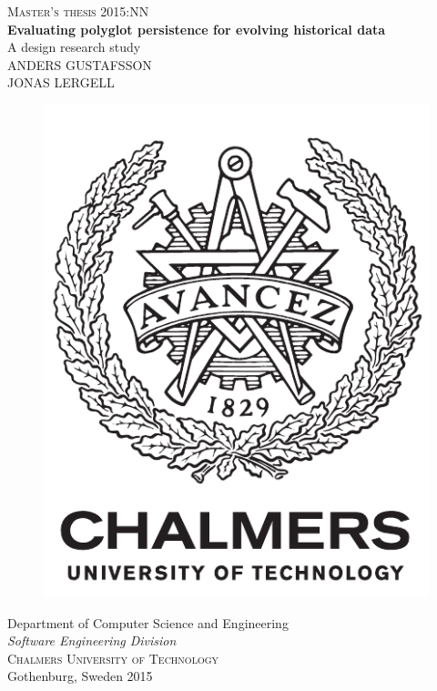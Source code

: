 \newpage
\thispagestyle{empty}
\begin{center}
	\textsc{\large Master's thesis 2015:NN}\\[4cm]
	\textbf{\Large Evaluating polyglot persistence for evolving historical data} \\[1cm]
	{\large A design research study}\\[1cm]
	{\large ANDERS GUSTAFSSON}\\[0.3cm]
	{\large JONAS LERGELL}
	
	\vfill	
	\begin{figure}[h!]
	\centering
	\includegraphics[width=0.2\pdfpagewidth]{figure/auxiliary/logo_eng.pdf} \\	
	\end{figure}	\vspace{5mm}	
	
    Department of Computer Science and Engineering\\
	\emph{Software Engineering Division}\\
	\textsc{Chalmers University of Technology} \\
	Gothenburg, Sweden 2015 \\
\end{center}


